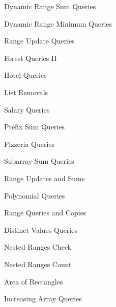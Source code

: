 \begin{practice}
\begin{pplist}
  \item Dynamic Range Sum Queries
  \item Dynamic Range Minimum Queries
  \item Range Update Queries
  \item Forest Queries II
  \item Hotel Queries
  \item List Removals
  \item Salary Queries
  \item Prefix Sum Queries
  \item Pizzeria Queries
\end{pplist}
\begin{pplist}
  \item Subarray Sum Queries
  \item Range Updates and Sums
  \item Polynomial Queries
  \item Range Queries and Copies
  \item Distinct Values Queries
  \item Nested Ranges Check
  \item Nested Ranges Count
  \item Area of Rectangles
  \item Increasing Array Queries
\end{pplist}
\end{practice}
